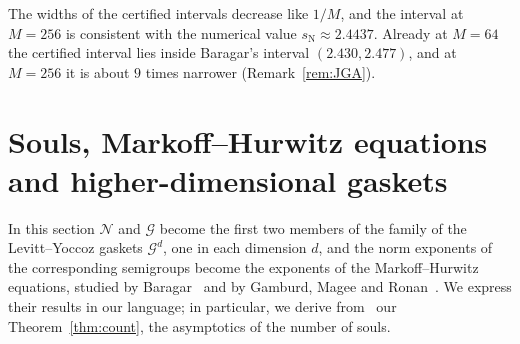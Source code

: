 \documentclass[11pt]{amsart}
\theoremstyle{definition}
\theoremstyle{remark}
\newcommand{\cN}{\mathcal N}
\newcommand{\cG}{\mathcal G}
\newcommand{\sN}{s_{\mathrm N}}
\begin{document}
The widths of the certified intervals decrease like $1/M$, and the interval at $M=256$ is consistent with the numerical value $\sN\approx2.4437$. Already at $M=64$ the certified interval lies inside Baragar's interval $(2.430,2.477)$, and at $M=256$ it is about $9$ times narrower (Remark~\ref{rem:JGA}).

\section{Souls, Markoff--Hurwitz equations and higher-dimensional gaskets}\label{sec:MH}

In this section $\cN$ and $\cG$ become the first two members of the family of the Levitt--Yoccoz gaskets $\mathcal G^d$, one in each dimension $d$, and the norm exponents of the corresponding semigroups become the exponents of the Markoff--Hurwitz equations, studied by Baragar~\cite{Bar98} and by Gamburd, Magee and Ronan~\cite{GMR19}. We express their results in our language; in particular, we derive from~\cite[Thm.~13]{GMR19} our Theorem~\ref{thm:count}, the asymptotics of the number of souls.
\end{document}

